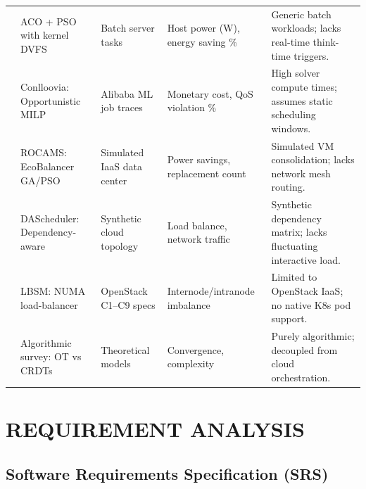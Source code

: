 \documentclass[12pt,a4paper]{report}
\begin{document}
\begin{table}[htbp]
\begin{tabularx}{\linewidth}{@{}p{0.8cm}p{2.8cm}p{2.3cm}p{3.2cm}X@{}}
			\cite{dvfs} & ACO + PSO with kernel DVFS & Batch server tasks & Host power (W), energy saving \% & Generic batch workloads; lacks real-time think-time triggers. \\
			\cite{conlloovia} & Conlloovia: Opportunistic MILP & Alibaba ML job traces & Monetary cost, QoS violation \% & High solver compute times; assumes static scheduling windows. \\
			\cite{rocams} & ROCAMS: EcoBalancer GA/PSO & Simulated IaaS data center & Power savings, replacement count & Simulated VM consolidation; lacks network mesh routing. \\
			\cite{dascheduler} & DAScheduler: Dependency-aware & Synthetic cloud topology & Load balance, network traffic & Synthetic dependency matrix; lacks fluctuating interactive load. \\
			\cite{lbsm} & LBSM: NUMA load-balancer & OpenStack C1--C9 specs & Internode/intranode imbalance & Limited to OpenStack IaaS; no native K8s pod support. \\
			\cite{crdtsurvey} & Algorithmic survey: OT vs CRDTs & Theoretical models & Convergence, complexity & Purely algorithmic; decoupled from cloud orchestration. \\ \bottomrule
		\end{tabularx}
	\end{table}
	
	\chapter{REQUIREMENT ANALYSIS}
	
	\section{Software Requirements Specification (SRS)}
\end{document}
